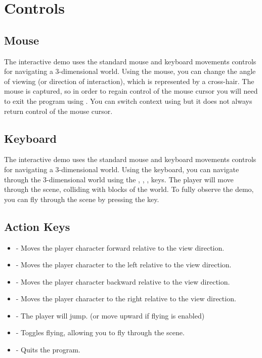\documentclass[a4paper,11pt,titlepage]{scrartcl}
\begin{document}
\section{Controls}
\subsection{Mouse}
The interactive demo uses the standard mouse and keyboard movements controls for navigating a 3-dimensional world. Using the mouse, you can change the angle of viewing (or direction of interaction), which is represented by a cross-hair. The mouse is captured, so in order to regain control of the mouse cursor you will need to exit the program using . You can switch context using  but it does not always return control of the mouse cursor.

\subsection{Keyboard}
The interactive demo uses the standard mouse and keyboard movements controls for navigating a 3-dimensional world. Using the keyboard, you can navigate through the 3-dimensional world using the , , ,  keys. The player will move through the scene, colliding with blocks of the world. To fully observe the demo, you can fly through the scene by pressing the  key.

\subsection{Action Keys}
\begin{itemize}
	\item {} - Moves the player character forward relative to the view direction.
	\item {} - Moves the player character to the left relative to the view direction.
	\item {} - Moves the player character backward relative to the view direction.
	\item {} - Moves the player character to the right relative to the view direction.
	\item {} - The player will jump. (or move upward if flying is enabled)
	\item {} - Toggles flying, allowing you to fly through the scene.
	\item {} - Quits the program.
\end{itemize}
      
\end{document}
